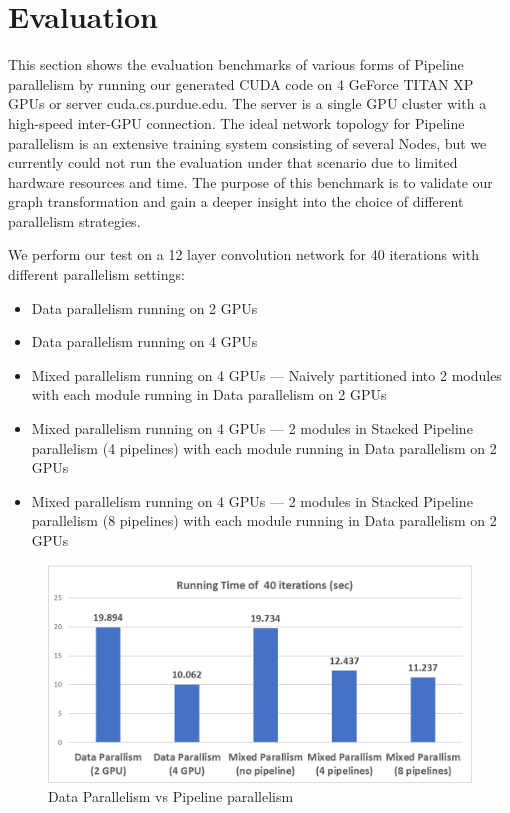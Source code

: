 \documentclass[sigplan, nonacm]{acmart}\settopmatter{printfolios=true,printccs=false,printacmref=false}
\begin{document}
 \section{Evaluation}\label{evaluation}
 This section shows the evaluation benchmarks of various forms of Pipeline parallelism by running our generated CUDA code on 4 GeForce TITAN XP GPUs or server cuda.cs.purdue.edu. The server is a single GPU cluster with a high-speed inter-GPU connection. The ideal network topology for Pipeline parallelism is an extensive training system consisting of several Nodes, but we currently could not run the evaluation under that scenario due to limited hardware resources and time. The purpose of this benchmark is to validate our graph transformation and gain a deeper insight into the choice of different parallelism strategies.\par
 We perform our test on a 12 layer convolution network for 40 iterations with different parallelism settings:
 \begin{itemize}
   \item Data parallelism running on 2 GPUs
   \item Data parallelism running on 4 GPUs
   \item Mixed parallelism running on 4 GPUs --- Naively partitioned into 2 modules with each module running in Data parallelism on 2 GPUs
   \item Mixed parallelism running on 4 GPUs --- 2 modules in Stacked Pipeline parallelism (4 pipelines) with each module running in Data parallelism on 2 GPUs
   \item Mixed parallelism running on 4 GPUs --- 2 modules in Stacked Pipeline parallelism (8 pipelines) with each module running in Data parallelism on 2 GPUs
 \end{itemize}
 \begin{figure}[htbp]
  \centering
  \includegraphics[scale=0.5]{pipelineparallelruntime.png}
  \caption{Data Parallelism vs Pipeline parallelism}
  \label{fig:runtime}
\end{figure}
\end{document}
